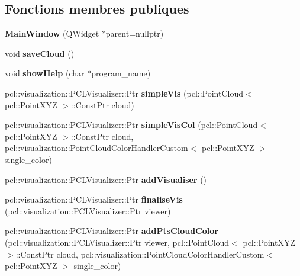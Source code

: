 \subsection*{Fonctions membres publiques}
\begin{DoxyCompactItemize}
\item 
\mbox{\label{classMainWindow_a996c5a2b6f77944776856f08ec30858d}} 
{\bfseries Main\+Window} (Q\+Widget $\ast$parent=nullptr)
\item 
\mbox{\label{classMainWindow_a6cd41eb337005e89a01d285c16bce574}} 
void {\bfseries save\+Cloud} ()
\item 
\mbox{\label{classMainWindow_ac65e57d0a71013b887f6a14119514623}} 
void {\bfseries show\+Help} (char $\ast$program\+\_\+name)
\item 
\mbox{\label{classMainWindow_a40a7f3dc356ee6e31d07b6c8b1e7e5da}} 
pcl\+::visualization\+::\+P\+C\+L\+Visualizer\+::\+Ptr {\bfseries simple\+Vis} (pcl\+::\+Point\+Cloud$<$ pcl\+::\+Point\+X\+YZ $>$\+::Const\+Ptr cloud)
\item 
\mbox{\label{classMainWindow_ac42871a20623031b7efcb79a95ebb672}} 
pcl\+::visualization\+::\+P\+C\+L\+Visualizer\+::\+Ptr {\bfseries simple\+Vis\+Col} (pcl\+::\+Point\+Cloud$<$ pcl\+::\+Point\+X\+YZ $>$\+::Const\+Ptr cloud, pcl\+::visualization\+::\+Point\+Cloud\+Color\+Handler\+Custom$<$ pcl\+::\+Point\+X\+YZ $>$ single\+\_\+color)
\item 
\mbox{\label{classMainWindow_ada10cd1ae8dc065eb0b50f7e98552524}} 
pcl\+::visualization\+::\+P\+C\+L\+Visualizer\+::\+Ptr {\bfseries add\+Visualiser} ()
\item 
\mbox{\label{classMainWindow_a3d0135e9222e369a50b6f18b333da36d}} 
pcl\+::visualization\+::\+P\+C\+L\+Visualizer\+::\+Ptr {\bfseries finalise\+Vis} (pcl\+::visualization\+::\+P\+C\+L\+Visualizer\+::\+Ptr viewer)
\item 
\mbox{\label{classMainWindow_a4bc39a7a5dd6643c024b08578988bc49}} 
pcl\+::visualization\+::\+P\+C\+L\+Visualizer\+::\+Ptr {\bfseries add\+Pts\+Cloud\+Color} (pcl\+::visualization\+::\+P\+C\+L\+Visualizer\+::\+Ptr viewer, pcl\+::\+Point\+Cloud$<$ pcl\+::\+Point\+X\+YZ $>$\+::Const\+Ptr cloud, pcl\+::visualization\+::\+Point\+Cloud\+Color\+Handler\+Custom$<$ pcl\+::\+Point\+X\+YZ $>$ single\+\_\+color)

\end{DoxyCompactItemize}
